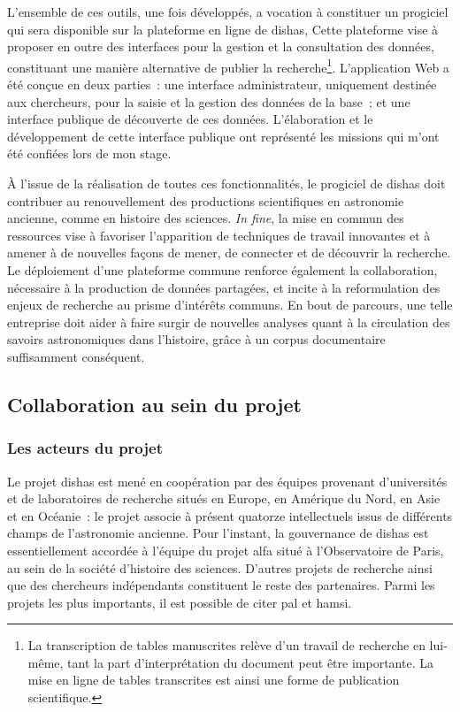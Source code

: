 \documentclass[a4paper,12pt,twoside]{book}
\newcommand{\eng}{\emph}
\newcommand{\dishas}{\gls{dishas}\xspace}
\newcommand{\alfa}{\gls{alfa}\xspace}
\newcommand{\hamsi}{\gls{hamsi}\xspace}
\newcommand{\pal}{\gls{pal}\xspace}
\begin{document}
L'ensemble de ces outils, une fois développés, a vocation à constituer un progiciel qui sera disponible sur la plateforme en ligne de \dishas, Cette plateforme vise à proposer en outre des interfaces pour la gestion et la consultation des données, constituant une manière alternative de publier la recherche\footnote{La transcription de tables manuscrites relève d'un travail de recherche en lui-même, tant la part d'interprétation du document peut être importante. La mise en ligne de tables transcrites est ainsi une forme de publication scientifique.}. L'application Web a été conçue en deux parties~: une interface administrateur, uniquement destinée aux chercheurs, pour la saisie et la gestion des données de la base~; et une interface publique de découverte de ces données. L'élaboration et le développement de cette interface publique ont représenté les missions qui m'ont été confiées lors de mon stage.

À l'issue de la réalisation de toutes ces fonctionnalités, le progiciel de \dishas doit contribuer au renouvellement des productions scientifiques en astronomie ancienne, comme en histoire des sciences. \eng{In fine}, la mise en commun des ressources vise à favoriser l'apparition de techniques de travail innovantes et à amener à de nouvelles façons de mener, de connecter et de découvrir la recherche. Le déploiement d'une plateforme commune renforce également la collaboration, nécessaire à la production de données partagées, et incite à la reformulation des enjeux de recherche au prisme d'intérêts communs. En bout de parcours, une telle entreprise doit aider à faire surgir de nouvelles analyses quant à la circulation des savoirs astronomiques dans l'histoire, grâce à un corpus documentaire suffisamment conséquent.

		\subsection{Collaboration au sein du projet}
			\subsubsection{Les acteurs du projet}
Le projet \dishas est mené en coopération par des équipes provenant d'universités et de laboratoires de recherche situés en Europe, en Amérique du Nord, en Asie et en Océanie~: le projet associe à présent quatorze intellectuels issus de différents champs de l'astronomie ancienne. Pour l'instant, la gouvernance de \dishas est essentiellement accordée à l'équipe du projet \alfa situé à l'Observatoire de Paris, au sein de la société d'histoire des sciences. D'autres projets de recherche ainsi que des chercheurs indépendants constituent le reste des partenaires. Parmi les projets les plus importants, il est possible de citer \pal et \hamsi.
\end{document}
